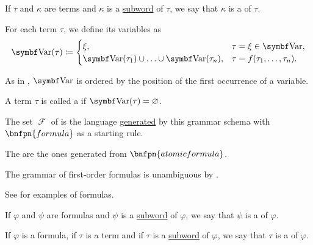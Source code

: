 \begin{definition}
\begin{DefEnum}
     If \( \tau \) and \( \kappa \) are terms and \( \kappa \) is a \hyperref[def:language/subword]{subword} of \( \tau \), we say that \( \kappa \) is a  of \( \tau \).

     For each term \( \tau \), we define its variables as
    \begin{equation}\label{eq:def:first_order_syntax/term_variables}
      \Bold{Var}(\tau) \coloneqq \begin{cases}
        \xi,                                                    &\tau = \xi \in \Bold{Var},        \\
        \Bold{Var}(\tau_1) \cup \ldots \cup \Bold{Var}(\tau_n), &\tau = f(\tau_1, \ldots, \tau_n).
      \end{cases}
    \end{equation}

    As in , \( \Bold{Var} \) is ordered by the position of the first occurrence of a variable.

     A term \( \tau \) is called a  if \( \Bold{Var}(\tau) = \varnothing \).

     The set \( \mscrF \) of  is the language \hyperref[def:grammar_derivation/grammar_language]{generated} by this grammar schema with \( \bnfpn{formula} \) as a starting rule.

    The  are the ones generated from \( \bnfpn{atomic formula} \).

    The grammar of first-order formulas is unambiguous by .

    See  for examples of formulas.

     If \( \varphi \) and \( \psi \) are formulas and \( \psi \) is a \hyperref[def:language/subword]{subword} of \( \varphi \), we say that \( \psi \) is a  of \( \varphi \).

     If \( \varphi \) is a formula, if \( \tau \) is a term and if \( \tau \) is a \hyperref[def:language/subword]{subword} of \( \varphi \), we say that \( \tau \) is a  of \( \varphi \).


\end{DefEnum}
\end{definition}
